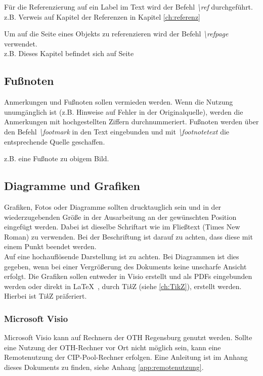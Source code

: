 		Für die Referenzierung auf ein Label im Text wird der Befehl \textit{\textbackslash ref} durchgeführt.\\
		z.B. Verweis auf Kapitel der Referenzen in Kapitel \ref{ch:referenz}

		Um auf die Seite eines Objekts zu referenzieren wird der Befehl \textit{\textbackslash refpage} verwendet.\\
		z.B. Dieses Kapitel befindet sich auf Seite \pageref{ch:referenz}

		\subsection{Fußnoten}
		\label{ch:fussnoten}
		Anmerkungen und Fußnoten sollen vermieden werden. Wenn die Nutzung unumgänglich ist (z.B. Hinweise auf Fehler in der Originalquelle), werden die Anmerkungen mit hochgestellten Ziffern durchnummeriert. Fußnoten werden über den Befehl \textit{\textbackslash footmark} in den Text eingebunden und mit \textit{\textbackslash footnotetext} die entsprechende Quelle geschaffen.

		z.B. eine Fußnote zu obigem Bild\footnotemark .

		\subsection{Diagramme und Grafiken}
		\label{ch:bilder}
		Grafiken, Fotos oder Diagramme sollten drucktauglich sein und in der wiederzugebenden Größe in der Ausarbeitung an der gewünschten Position eingefügt werden. Dabei ist dieselbe Schriftart wie im Fließtext (Times New Roman) zu verwenden. Bei der Beschriftung ist darauf zu achten, dass diese mit einem Punkt beendet werden.\\
		Auf eine hochauflösende Darstellung ist zu achten. Bei Diagrammen ist dies gegeben, wenn bei einer Vergrößerung des Dokuments keine unscharfe Ansicht erfolgt. Die Grafiken sollen entweder in Visio erstellt und als PDFs eingebunden werden oder direkt in \LaTeX \ , durch Ti\textit{k}Z (siehe \ref{ch:TikZ}), erstellt werden. Hierbei ist Ti\textit{k}Z präferiert.
		
		\subsubsection{Microsoft Visio}		
		\label{ch:microsoft_visio}
		Microsoft Visio kann auf Rechnern der OTH Regensburg genutzt werden. Sollte eine Nutzung der OTH-Rechner vor Ort nicht möglich sein, kann eine Remotenutzung der CIP-Pool-Rechner erfolgen. Eine Anleitung ist im Anhang dieses Dokuments zu finden, siehe Anhang  \ref{app:remotenutzung}.\\

